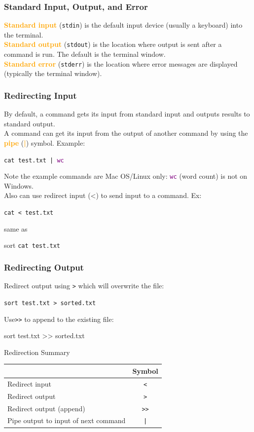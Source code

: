 \documentclass[xcolor=svgnames, colorlinks, handout]{beamer}
\newcommand{\purple}[1]{{\textcolor{purple}{#1}}}
\newcommand{\nl}{\\[1em]}
\newcommand{\define}[1]{\textbf{\textcolor{orange}{#1}}}
\newcommand{\ft}[1]{\frametitle{#1}}
\begin{document}
\begin{frame}\ft{Standard Input, Output, and Error}
\define{Standard input} ({\tt stdin}) is the default input device (usually a keyboard) into the terminal.\nl

\define{Standard output} ({\tt stdout}) is the location where output is sent after a command is run.  The default is the terminal window.\nl

\define{Standard error} ({\tt stderr}) is the location where error messages are displayed (typically the terminal window).

\end{frame}

\begin{frame}\ft{Redirecting Input}
By default, a command gets its input from standard input and outputs results to standard output.\nl

A command can get its input from the output of another command by using the \define{pipe} (\define{|}) symbol.  Example:
\begin{center}
{\tt cat test.txt | \purple{wc}}
\end{center}
Note the example commands are Mac OS/Linux only: {\tt \purple{wc}} (word count) is not on Windows.\nl

Also can use redirect input (<) to send input to a command.  Ex:
\begin{center}
{\tt cat < test.txt}
\end{center}
same as
\begin{center}sort
{\tt cat test.txt}
\end{center}


\end{frame}

\begin{frame}\ft{Redirecting Output}
Redirect output using {\tt >} which will overwrite the file:
\begin{center}
 {\tt sort test.txt > sorted.txt}
\end{center}



Use{\tt >>} to append to the existing file:
\begin{center}
{sort test.txt >> sorted.txt}
\end{center}


\end{frame}


\begin{frame}{Redirection Summary}
\begin{center}
\begin{tabular}{|l|c|}
\hline
& {\bf Symbol}\\\hline
Redirect input & 
{\tt <} \\
Redirect output
& {\tt >} \\
Redirect output (append)
& {\tt >}{\tt >}\\
Pipe output to input of next command
& {\tt |}\\\hline
\end{tabular}
\end{center}
\end{frame}
\end{document}
